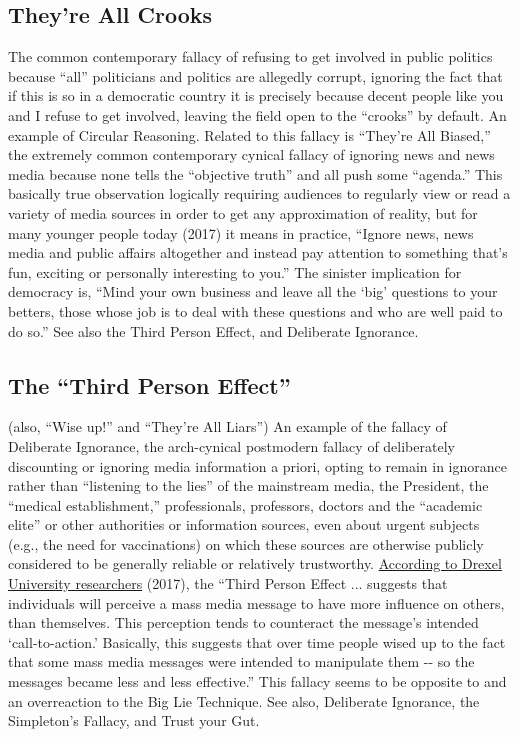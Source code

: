 \documentclass[10pt,a4paper,british]{article}
\begin{document}
\begin{multicols}{2}
	\subsection{They're All Crooks} The common contemporary fallacy of refusing
	to get involved in public politics because ``all'' politicians and politics
	are allegedly corrupt, ignoring the fact that if this is so in a democratic
	country it is precisely because decent people like you and I refuse to get
	involved, leaving the field open to the ``crooks'' by default. An example
	of Circular Reasoning. Related to this fallacy is ``They're All Biased,''
	the extremely common contemporary cynical fallacy of ignoring news and news
	media because none tells the ``objective truth'' and all push some
	``agenda.''  This basically true observation logically requiring audiences
	to regularly view or read a variety of media sources in order to get any
	approximation of reality, but for many younger people today (2017) it means
	in practice, ``Ignore news, news media and public affairs altogether and
	instead pay attention to something that's fun, exciting or personally
	interesting to you.'' The sinister implication for democracy is, ``Mind
	your own business and leave all the `big' questions to your betters, those
	whose job is to deal with these questions and who are well paid to do so.''
	See also the Third Person Effect, and Deliberate Ignorance.

	\subsection{The ``Third Person Effect'' } (also, ``Wise up!'' and ``They're
	All Liars'')  An example of the fallacy of Deliberate Ignorance, the
	arch{-}cynical postmodern fallacy of deliberately discounting or ignoring
	media information a priori, opting to remain in ignorance rather than
	``listening to the lies'' of the mainstream media, the President, the
	``medical establishment,'' professionals, professors, doctors and the
	``academic elite'' or other authorities or information sources, even about
	urgent subjects (e.g., the need for vaccinations) on which these sources
	are otherwise publicly considered to be generally reliable or relatively
	trustworthy.
	\href{https://www.eurekalert.org/pub_releases/2017-02/du-na020817.php}{According
	to Drexel University researchers} (2017), the ``Third Person Effect ...
	suggests that individuals will perceive a mass media message to have more
	influence on others, than themselves. This perception tends to counteract
	the message's intended `call{-}to{-}action.' Basically, this suggests that
	over time people wised up to the fact that some mass media messages were
	intended to manipulate them {-}{-} so the messages became less and less
	effective.'' This fallacy seems to be opposite to and an overreaction to
	the Big Lie Technique. See also, Deliberate Ignorance, the Simpleton's
	Fallacy, and Trust your Gut.


\end{multicols}
\end{document}
